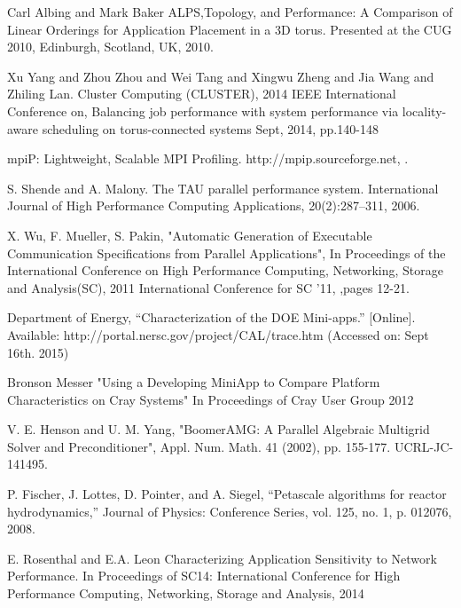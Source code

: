 \documentclass[conference]{IEEEtran}
\begin{document}
\begin{thebibliography}{10}
Carl Albing and Mark Baker
\newblock ALPS,Topology, and Performance: A Comparison of Linear Orderings for 
Application Placement in a 3D torus.
\newblock Presented at the CUG 2010, Edinburgh, Scotland, UK, 2010.

Xu Yang and Zhou Zhou and Wei Tang and Xingwu Zheng and Jia Wang and Zhiling Lan.
\newblock Cluster Computing (CLUSTER), 2014 IEEE International Conference on,
\newblock Balancing job performance with system performance via locality-aware scheduling on torus-connected systems
\newblock Sept, 2014,
\newblock pp.140-148

\newblock mpiP: Lightweight, Scalable MPI Profiling.
\newblock http://mpip.sourceforge.net, 
.

S. Shende and A. Malony. 
\newblock The TAU parallel performance system. 
\newblock International Journal of High Performance Computing Applications, 20(2):287–311, 2006.

X. Wu, F. Mueller, S. Pakin, 
\newblock "Automatic Generation of Executable Communication Specifications from Parallel Applications", 
\newblock In {Proceedings of the International Conference on High Performance Computing, Networking, Storage and Analysis(SC), 2011 International Conference for}
\newblock SC '11,
,pages 12-21.

Department of Energy, “Characterization of the DOE Mini-apps.” [Online].
\newblock Available: http://portal.nersc.gov/project/CAL/trace.htm
\newblock (Accessed on: Sept 16th. 2015)

Bronson Messer
\newblock "Using a Developing MiniApp to Compare Platform Characteristics on Cray Systems"
\newblock In Proceedings of Cray User Group 2012

V. E. Henson and U. M. Yang, 
\newblock "BoomerAMG: A Parallel Algebraic Multigrid Solver and Preconditioner",
\newblock Appl. Num. Math. 41 (2002), pp. 155-177. UCRL-JC-141495.

P. Fischer, J. Lottes, D. Pointer, and A. Siegel, 
\newblock “Petascale algorithms for reactor hydrodynamics,”
\newblock Journal of Physics: Conference Series, vol. 125, no. 1, p. 012076, 2008.


E. Rosenthal and E.A. Leon
\newblock Characterizing Application Sensitivity to Network Performance.
\newblock  In {Proceedings of SC14: International
Conference for High Performance Computing, Networking, Storage and Analysis},
2014


\end{thebibliography}
\end{document}
